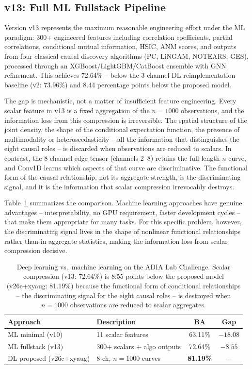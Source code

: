 \subsection{v13: Full ML Fullstack Pipeline}

Version v13 represents the maximum reasonable engineering effort under the ML paradigm: 300+ engineered features including correlation coefficients, partial correlations, conditional mutual information, HSIC, ANM scores, and outputs from four classical causal discovery algorithms (PC, LiNGAM, NOTEARS, GES), processed through an XGBoost/LightGBM/CatBoost ensemble with GNN refinement. This achieves 72.64\% -- below the 3-channel DL reimplementation baseline (v2: 73.96\%) and 8.44 percentage points below the proposed model.

The gap is mechanistic, not a matter of insufficient feature engineering. Every scalar feature in v13 is a fixed aggregation of the $n = 1000$ observations, and the information loss from this compression is irreversible. The spatial structure of the joint density, the shape of the conditional expectation function, the presence of multimodality or heteroscedasticity -- all the information that distinguishes the eight causal roles -- is discarded when observations are reduced to scalars. In contrast, the 8-channel edge tensor (channels 2--8) retains the full length-$n$ curve, and Conv1D learns which aspects of that curve are discriminative. The functional form of the causal relationship, not its aggregate strength, is the discriminating signal, and it is the information that scalar compression irrevocably destroys.

Table~\ref{tab:dl_vs_ml} summarizes the comparison. Machine learning approaches have genuine advantages -- interpretability, no GPU requirement, faster development cycles -- that make them appropriate for many tasks. For this specific problem, however, the discriminating signal lives in the shape of nonlinear functional relationships rather than in aggregate statistics, making the information loss from scalar compression decisive.

\begin{table}[ht]
	\centering
	\caption{Deep learning vs.\ machine learning on the ADIA Lab Challenge. Scalar compression (v13: 72.64\%) is 8.55 points below the proposed model (v26e+xyaug: 81.19\%) because the functional form of conditional relationships -- the discriminating signal for the eight causal roles -- is destroyed when $n=1000$ observations are reduced to scalar aggregates.}
	\label{tab:dl_vs_ml}
	\small
	\begin{tabularx}{\textwidth}{lXcc}
		\toprule
		\textbf{Approach} & \textbf{Description} & \textbf{BA} & \textbf{Gap} \\
		\midrule
		ML minimal (v10) & 11 scalar features & 63.11\% & $-18.08$ \\
		ML fullstack (v13) & 300+ scalars + algo outputs & 72.64\% & $-8.55$ \\
		DL proposed (v26e+xyaug) & 8-ch, $n=1000$ curves & \textbf{81.19\%} & --- \\
		\bottomrule
	\end{tabularx}
\end{table}

